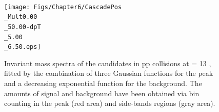 \begin{landscape}
\begin{figure}[h]
\begin{minipage}[t]{.25\textwidth}
    \end{minipage}  \\
    \begin{minipage}[t]{.25\textwidth}
        \hspace*{-2.5cm}
        \texttt{[image: Figs/Chapter6/CascadePos\\\_Mult0.00\\\_50.00-dpT\\\_5.00\\\_6.50.eps]}
    \end{minipage}
    \hfill
	\caption{Invariant mass spectra of the \rmAxiP candidates in pp collisions at \sqrtS = 13 \tev, fitted by the combination of three Gaussian functions for the peak and a decreasing exponential function for the background. The amounts of signal and background have been obtained via bin counting in the peak (red area) and side-bands regions (gray area).}
	\label{fig:InvMassXiPlusVPt}
\end{figure}



\end{landscape}

